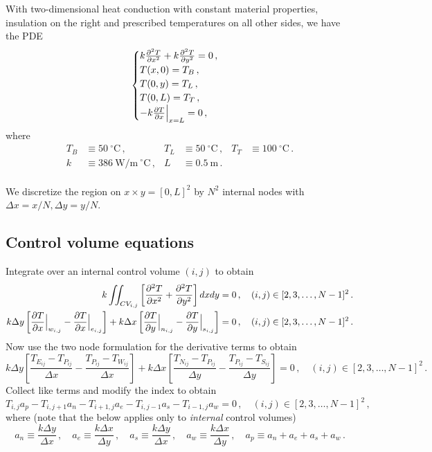 \documentclass{article}
\begin{document}
With two-dimensional heat conduction with constant material properties, insulation on the right and prescribed temperatures on all other sides, we have the PDE
\begin{equation}
	\begin{cases}
		k \pdv{^2T}{x^2} + k \pdv{^2T}{y^2} = 0\,,\\
		T(x, 0) = T_B\,,\\
		T(0, y) = T_L\,,\\
		T(0, L) = T_T\,,\\
		-k \pdv{T}{x} \Big|_{x = L} = 0\,,
	\end{cases}
\end{equation}
where
\begin{align*}
	T_B & \equiv 50~^\circ\text{C}\,, & T_L & \equiv 50~^\circ\text{C}\,, & T_T & \equiv 100~^\circ\text{C}\,.\\
	k & \equiv 386~\text{W/m}~^\circ\text{C}\,, & L & \equiv 0.5~\text{m}\,.\\
\end{align*}

We discretize the region on $x \times y = [0, L]^2$ by $N^2$ internal nodes with $\Delta x = x / N, \Delta y = y / N$.

\subsection*{Control volume equations}

Integrate over an internal control volume $(i,j)$ to obtain
\begin{align*}
	k \iint_{CV_{i, j}} \left[ \pdv{^2T}{x^2} + \pdv{^2T}{y^2} \right] dxdy & = 0\,, \quad (i, j) \in [2, 3, \ldots, N - 1]^2\,.\\
	k \Delta y \left[ \pdv{T}{x}\Big|_{w_{i,j}} - \pdv{T}{x}\Big|_{e_{i,j}} \right] + k \Delta x \left[ \pdv{T}{y}\Big|_{n_{i,j}} - \pdv{T}{y}\Big|_{s_{i,j}} \right] & = 0\,, \quad (i, j) \in [2, 3, \ldots, N - 1]^2\,.
\end{align*}
Now use the two node formulation for the derivative terms to obtain
\[
	k \Delta y \left[\frac{T_{E_{ij}} - T_{P_{ij}}}{\Delta x} - \frac{T_{P_{ij}} - T_{W_{ij}}}{\Delta x}\right] + k \Delta x \left[ \frac{T_{N_{ij}} - T_{P_{ij}}}{\Delta y} -\frac{T_{P_{ij}} - T_{S_{ij}}}{\Delta y} \right] = 0\,, \quad (i, j) \in [2, 3, \ldots, N - 1]^2\,.
\]
Collect like terms and modify the index to obtain
\begin{equation}
	\label{eq:internal}
	T_{i,j} a_p - T_{i, j+1} a_n - T_{i+1, j} a_e - T_{i, j-1} a_s - T_{i-1, j} a_w = 0\,,\quad (i, j) \in [2, 3, \ldots, N - 1]^2\,,
\end{equation}
where (note that the below applies only to \textit{internal} control volumes)
\[
	a_n \equiv \frac{k \Delta y}{\Delta x}\,, \quad a_e \equiv \frac{k \Delta x}{\Delta y}\,, \quad a_s \equiv \frac{k\Delta y}{\Delta x}\,, \quad a_w \equiv \frac{k\Delta x}{\Delta y}\,, \quad a_p \equiv a_n + a_e + a_s + a_w\,.
\]
\end{document}
